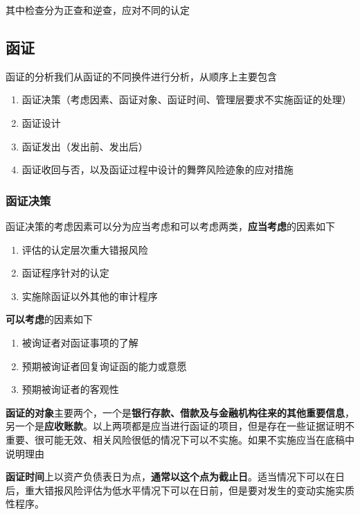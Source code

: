 \documentclass[UTF8,12pt]{ctexart}
\numberwithin{equation}{section} %
\numberwithin{figure}{section}
\numberwithin{table}{section}
\begin{document}
	其中检查分为正查和逆查，应对不同的认定
	
	\subsection{函证}
	函证的分析我们从函证的不同换件进行分析，从顺序上主要包含
	\begin{enumerate}
		\item 函证决策（考虑因素、函证对象、函证时间、管理层要求不实施函证的处理）
		
		\item 函证设计
		
		\item 函证发出（发出前、发出后）
		
		\item 函证收回与否，以及函证过程中设计的舞弊风险迹象的应对措施
	\end{enumerate}
	
	\subsubsection{函证决策}
	函证决策的考虑因素可以分为应当考虑和可以考虑两类，\textbf{应当考虑}的因素如下
	\begin{enumerate}
		\item 评估的认定层次重大错报风险
		
		\item 函证程序针对的认定
		
		\item 实施除函证以外其他的审计程序
	\end{enumerate}
	
	\textbf{可以考虑}的因素如下
	\begin{enumerate}
		\item 被询证者对函证事项的了解
		
		\item 预期被询证者回复询证函的能力或意愿
		
		\item 预期被询证者的客观性
	\end{enumerate}
	
	\textbf{函证的对象}主要两个，一个是\textbf{银行存款、借款及与金融机构往来的其他重要信息}，另一个是\textbf{应收账款}。以上两项都是应当进行函证的项目，但是存在一些证据证明不重要、很可能无效、相关风险很低的情况下可以不实施。如果不实施应当在底稿中说明理由
	
	\textbf{函证时间}上以资产负债表日为点，\textbf{通常以这个点为截止日}。适当情况下可以在日后，重大错报风险评估为低水平情况下可以在日前，但是要对发生的变动实施实质性程序。
	
\end{document}

